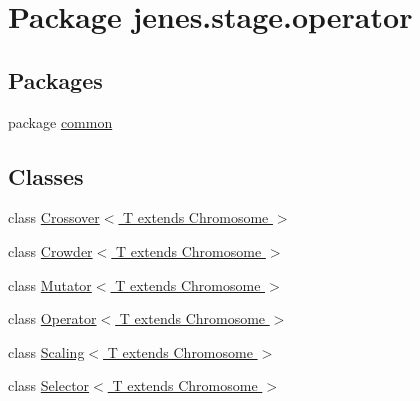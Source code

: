 \hypertarget{namespacejenes_1_1stage_1_1operator}{\section{Package jenes.\-stage.\-operator}
\label{namespacejenes_1_1stage_1_1operator}
}
\subsection*{Packages}
\begin{DoxyCompactItemize}
\item 
package \hyperlink{namespacejenes_1_1stage_1_1operator_1_1common}{common}
\end{DoxyCompactItemize}
\subsection*{Classes}
\begin{DoxyCompactItemize}
\item 
class \hyperlink{classjenes_1_1stage_1_1operator_1_1_crossover_3_01_t_01extends_01_chromosome_01_4}{Crossover$<$ T extends Chromosome $>$}
\item 
class \hyperlink{classjenes_1_1stage_1_1operator_1_1_crowder_3_01_t_01extends_01_chromosome_01_4}{Crowder$<$ T extends Chromosome $>$}
\item 
class \hyperlink{classjenes_1_1stage_1_1operator_1_1_mutator_3_01_t_01extends_01_chromosome_01_4}{Mutator$<$ T extends Chromosome $>$}
\item 
class \hyperlink{classjenes_1_1stage_1_1operator_1_1_operator_3_01_t_01extends_01_chromosome_01_4}{Operator$<$ T extends Chromosome $>$}
\item 
class \hyperlink{classjenes_1_1stage_1_1operator_1_1_scaling_3_01_t_01extends_01_chromosome_01_4}{Scaling$<$ T extends Chromosome $>$}
\item 
class \hyperlink{classjenes_1_1stage_1_1operator_1_1_selector_3_01_t_01extends_01_chromosome_01_4}{Selector$<$ T extends Chromosome $>$}
\end{DoxyCompactItemize}

